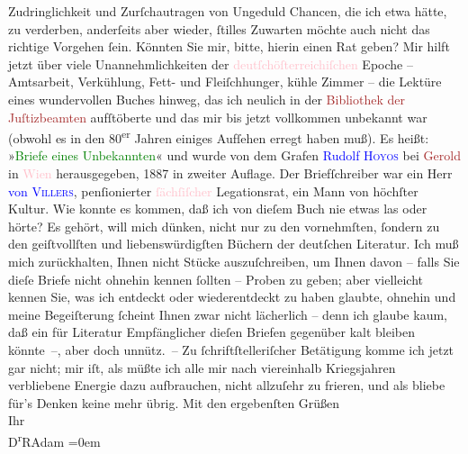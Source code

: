                Zudringlichkeit und Zurſchautragen von Ungeduld Chancen, die ich etwa hätte, zu
               verderben, anderſeits aber wieder, ſtilles Zuwarten möchte auch nicht das {\pb}richtige Vorgehen ſein. Könnten Sie mir,
               bitte, hierin einen Rat geben?\pend
           \pstart
           Mir hilft jetzt über viele Unannehmlichkeiten der \textcolor{pink}{deutſchöſterreichiſchen}{}\ledrightnote{\textcolor{pink}{Österreich}} Epoche – Amtsarbeit, Verkühlung, Fett- und
               Fleiſchhunger, kühle Zimmer – die Lektüre eines wundervollen Buches hinweg, das ich
               neulich in der \textcolor{brown}{Bibliothek der Juſtizbeamten}{}\ledrightnote{\textcolor{brown}{Privatbibliothek der Wiener Justizbeamten}}
               aufſtöberte und das mir bis jetzt vollkommen unbekannt war (obwohl es in den
                     80\textsuperscript{er} Jahren einiges Aufſehen erregt
               haben muß). Es heißt: »\textcolor{green}{Briefe eines Unbekannten}{}\ledrightnote{\textcolor{green}{Briefe eines Unbekannten}}«
               und wurde von dem Grafen \textcolor{blue}{Rudolf \textsc{Hoyos}}{}\ledrightnote{\textcolor{blue}{Rudolf von Hoyos}} bei \textcolor{brown}{Gerold}{}\ledrightnote{\textcolor{brown}{Carl Gerold’s Sohn}} in \textcolor{pink}{Wien}{}\ledrightnote{\textcolor{pink}{Wien}} herausgegeben, 1887 in zweiter Auflage. Der Briefſchreiber
               war ein Herr \textcolor{blue}{von \textsc{Villers}}{}\ledrightnote{\textcolor{blue}{Alexander von Villers}}, penſionierter \textcolor{pink}{ſächſiſcher}{}\ledrightnote{\textcolor{pink}{Sachsen}} Legationsrat, ein
               Mann von höchſter Kultur. Wie konnte es kommen, daß ich von dieſem Buch nie etwas las
               oder hörte? Es gehört, will mich dünken, nicht nur zu den vornehmſten, ſondern zu den
               geiſtvollſten und liebenswürdigſten Büchern der deutſchen {\pb}Literatur. Ich muß mich zurückhalten,
               Ihnen nicht Stücke auszuſchreiben, um Ihnen davon – falls Sie dieſe Briefe nicht
               ohnehin kennen ſollten – Proben zu geben; aber vielleicht kennen Sie, was ich
               entdeckt oder wiederentdeckt zu haben glaubte, ohnehin und meine Begeiſterung ſcheint
               Ihnen zwar nicht lächerlich – denn ich glaube kaum, daß ein für Literatur
               Empfänglicher dieſen Briefen gegenüber kalt bleiben könnte –, aber doch unnütz. –\pend
           \pstart
           Zu ſchriftſtelleriſcher Betätigung komme ich jetzt gar nicht; mir iſt, als müßte ich
               alle mir nach viereinhalb Kriegsjahren verbliebene Energie dazu aufbrauchen, nicht
               allzuſehr zu frieren, und als bliebe für’s Denken keine mehr übrig.\pend
           \pstart
           Mit den ergebenſten Grüßen{\\[\baselineskip]}Ihr{\\[\baselineskip]}\spacefill\mbox{D\textsuperscript{r}RAdam}\pend
           \leftskip=0em{}\endnumbering{}  
      